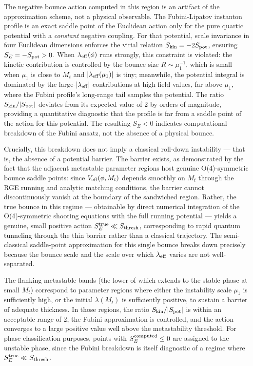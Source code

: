 \documentclass[aps,prd,twocolumn,superscriptaddress,nofootinbib]{revtex4-2}
\begin{document}
The negative bounce action computed in this region is an artifact of the approximation scheme, not a physical observable. The Fubini-Lipatov instanton profile is an exact saddle point of the Euclidean action only for the pure quartic potential with a \textit{constant} negative coupling. For that potential, scale invariance in four Euclidean dimensions enforces the virial relation $S_{\rm kin} = -2 S_{\rm pot}$, ensuring $S_E = -S_{\rm pot} > 0$. When $\lambda_{\rm eff}(\phi)$ runs strongly, this constraint is violated: the kinetic contribution is controlled by the bounce size $R \sim \mu_1^{-1}$, which is small when $\mu_1$ is close to $M_t$ and $|\lambda_{\rm eff}(\mu_1)|$ is tiny; meanwhile, the potential integral is dominated by the large-$|\lambda_{\rm eff}|$ contributions at high field values, far above $\mu_1$, where the Fubini profile's long-range tail samples the potential. The ratio $S_{\rm kin}/|S_{\rm pot}|$ deviates from its expected value of $2$ by orders of magnitude, providing a quantitative diagnostic that the profile is far from a saddle point of the action for this potential. The resulting $S_E < 0$ indicates computational breakdown of the Fubini ansatz, not the absence of a physical bounce.

Crucially, this breakdown does not imply a classical roll-down instability --- that is, the absence of a potential barrier. The barrier exists, as demonstrated by the fact that the adjacent metastable parameter regions host genuine O(4)-symmetric bounce saddle points: since $V_{\rm eff}(\phi, M_t)$ depends smoothly on $M_t$ through the RGE running and analytic matching conditions, the barrier cannot discontinuously vanish at the boundary of the sandwiched region. Rather, the true bounce in this regime --- obtainable by direct numerical integration of the O(4)-symmetric shooting equations with the full running potential --- yields a genuine, small positive action $S_E^{\rm true} \ll S_{\rm thresh}$, corresponding to rapid quantum tunneling through the thin barrier rather than a classical trajectory. The semi-classical saddle-point approximation for this single bounce breaks down precisely because the bounce scale and the scale over which $\lambda_{\rm eff}$ varies are not well-separated.

The flanking metastable bands (the lower of which extends to the stable phase at small $M_t$) correspond to parameter regions where either the instability scale $\mu_1$ is sufficiently high, or the initial $\lambda(M_t)$ is sufficiently positive, to sustain a barrier of adequate thickness. In those regions, the ratio $S_{\rm kin}/|S_{\rm pot}|$ is within an acceptable range of $2$, the Fubini approximation is controlled, and the action converges to a large positive value well above the metastability threshold. For phase classification purposes, points with $S_E^{\rm computed} \leq 0$ are assigned to the unstable phase, since the Fubini breakdown is itself diagnostic of a regime where $S_E^{\rm true} \ll S_{\rm thresh}$.
\end{document}
